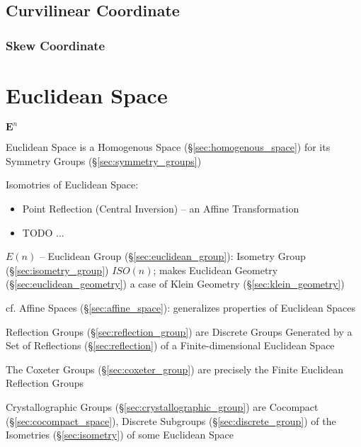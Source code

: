 \subsection{Curvilinear Coordinate}\label{sec:curvilinear_coordinate}

\subsubsection{Skew Coordinate}\label{sec:skew_coordinate}



\section{Euclidean Space}\label{sec:euclidean_space}

$\mathbf{E}^n$

Euclidean Space is a Homogenous Space (\S\ref{sec:homogenous_space}) for its
Symmetry Groups (\S\ref{sec:symmetry_groups})

Isomotries of Euclidean Space:
\begin{itemize}
  \item Point Reflection (Central Inversion) -- an Affine Transformation
  \item TODO
  ...
\end{itemize}

$E(n)$ -- Euclidean Group (\S\ref{sec:euclidean_group}): Isometry Group
(\S\ref{sec:isometry_group}) $ISO(n)$; makes Euclidean Geometry
(\S\ref{sec:euclidean_geometry}) a case of Klein Geometry
(\S\ref{sec:klein_geometry})

cf. Affine Spaces (\S\ref{sec:affine_space}): generalizes properties
of Euclidean Spaces

Reflection Groups (\S\ref{sec:reflection_group}) are Discrete Groups Generated
by a Set of Reflections (\S\ref{sec:reflection}) of a Finite-dimensional
Euclidean Space

The Coxeter Groups (\S\ref{sec:coxeter_group}) are precisely the Finite
Euclidean Reflection Groups

Crystallographic Groups (\S\ref{sec:crystallographic_group}) are Cocompact
(\S\ref{sec:cocompact_space}), Discrete Subgroups (\S\ref{sec:discrete_group})
of the Isometries (\S\ref{sec:isometry}) of some Euclidean Space



